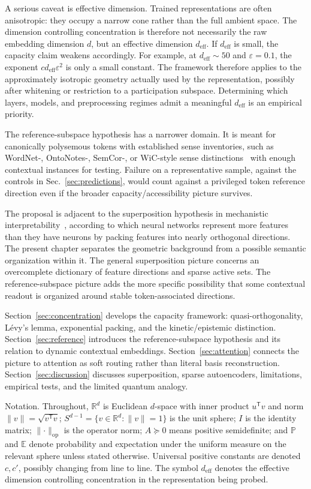 \documentclass[
  aps,
  reprint,
  superscriptaddress,
  floatfix,
  nofootinbib,
  longbibliography
]{revtex4-2}
\newcommand{\R}{\mathbb{R}}
\newcommand{\E}{\mathbb{E}}
\newcommand{\Prob}{\mathbb{P}}
\newcommand{\Sph}[1]{S^{#1}}
\newcommand{\deff}{d_{\mathrm{eff}}}
\newcommand{\T}{^{\mathsf{T}}}
\newcommand{\opnorm}[1]{\lVert #1 \rVert_{\mathrm{op}}}
\newcommand{\norm}[1]{\lVert #1 \rVert}
\begin{document}
A serious caveat is effective dimension. Trained representations are
often anisotropic: they occupy a narrow cone rather than the full
ambient space. The dimension controlling concentration is therefore
not necessarily the raw embedding dimension $d$, but an effective
dimension $\deff$. If $\deff$ is small, the capacity claim weakens
accordingly. For example, at $\deff\sim 50$ and $\varepsilon=0.1$, the
exponent $c\deff\varepsilon^{2}$ is only a small constant. The framework
therefore applies to the approximately isotropic geometry actually used
by the representation, possibly after whitening or restriction to a
participation subspace. Determining which layers, models, and
preprocessing regimes admit a meaningful $\deff$ is an empirical
priority.

The reference-subspace hypothesis has a narrower domain. It is meant for
canonically polysemous tokens with established sense inventories, such
as WordNet-, OntoNotes-, SemCor-, or WiC-style sense
distinctions~\cite{pilehvar2019wic} with enough contextual instances
for testing. Failure on a representative sample, against the controls
in Sec.~\ref{sec:predictions}, would count against a privileged token
reference direction even
if the broader capacity/accessibility picture survives.

The proposal is adjacent to the superposition hypothesis in mechanistic
interpretability~\cite{elhage2022superposition}, according to which neural networks
represent more features than they have neurons by packing features into
nearly orthogonal directions. The present chapter separates the
geometric background from a possible semantic organization within it.
The general superposition picture concerns an overcomplete dictionary
of feature directions and sparse active sets. The reference-subspace picture adds
the more specific possibility that some contextual readout is organized
around stable token-associated directions.

Section~\ref{sec:concentration} develops the capacity framework:
quasi-orthogonality, L\'evy's lemma, exponential packing, and the
kinetic/epistemic distinction. Section~\ref{sec:reference} introduces the
reference-subspace hypothesis and its relation to dynamic contextual
embeddings. Section~\ref{sec:attention} connects the picture to
attention as soft routing rather than literal basis reconstruction.
Section~\ref{sec:discussion} discusses superposition, sparse
autoencoders, limitations, empirical tests, and the limited quantum
analogy.

{Notation.}
Throughout, $\R^{d}$ is Euclidean $d$-space with inner product $u\T v$
and norm $\norm{v}=\sqrt{v\T v}$; $\Sph{d-1}=\{v\in\R^{d}:\norm{v}=1\}$
is the unit sphere; $I$ is the identity matrix; $\opnorm{\cdot}$ is the
operator norm; $A\succeq0$ means positive semidefinite; and $\Prob$ and
$\E$ denote probability and expectation under the uniform measure on
the relevant sphere unless stated otherwise. Universal positive
constants are denoted $c,c'$, possibly changing from line to line.
The symbol $\deff$ denotes the effective dimension controlling
concentration in the representation being probed.
\end{document}
